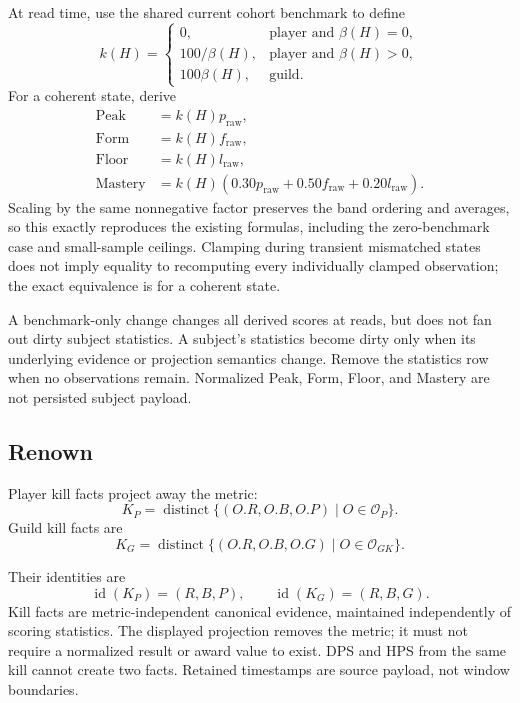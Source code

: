 \documentclass[11pt]{article}
\begin{document}
At read time, use the shared current cohort benchmark to define
\[
 k(H)=\begin{cases}
 0, & \text{player and }\beta(H)=0,\\
 100/\beta(H), & \text{player and }\beta(H)>0,\\
 100\beta(H), & \text{guild}.
 \end{cases}
\]
For a coherent state, derive
\[
\begin{aligned}
 \operatorname{Peak}&=k(H)p_{\mathrm{raw}},\\
 \operatorname{Form}&=k(H)f_{\mathrm{raw}},\\
 \operatorname{Floor}&=k(H)l_{\mathrm{raw}},\\
 \operatorname{Mastery}&=k(H)\left(0.30p_{\mathrm{raw}}
                  +0.50f_{\mathrm{raw}}+0.20l_{\mathrm{raw}}\right).
\end{aligned}
\]
Scaling by the same nonnegative factor preserves the band ordering and averages, so this exactly reproduces the existing formulas, including the zero-benchmark case and small-sample ceilings. Clamping during transient mismatched states does not imply equality to recomputing every individually clamped observation; the exact equivalence is for a coherent state.

A benchmark-only change changes all derived scores at reads, but does not fan out dirty subject statistics. A subject's statistics become dirty only when its underlying evidence or projection semantics change. Remove the statistics row when no observations remain. Normalized Peak, Form, Floor, and Mastery are not persisted subject payload.

\subsection{Renown}
Player kill facts project away the metric:
\[
  K_P=\operatorname{distinct}
  \{(O.R,O.B,O.P)\mid O\in\mathcal{O}_P\}.
\]
Guild kill facts are
\[
  K_G=\operatorname{distinct}
  \{(O.R,O.B,O.G)\mid O\in\mathcal{O}_{GK}\}.
\]

Their identities are
\[
  \operatorname{id}(K_P)=(R,B,P),
  \qquad
  \operatorname{id}(K_G)=(R,B,G).
\]
Kill facts are metric-independent canonical evidence, maintained independently of scoring statistics. The displayed projection removes the metric; it must not require a normalized result or award value to exist. DPS and HPS from the same kill cannot create two facts. Retained timestamps are source payload, not window boundaries.
\end{document}
